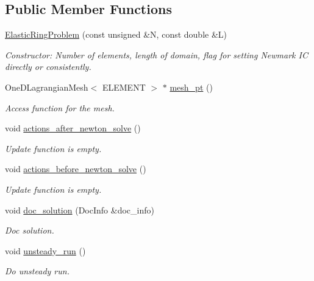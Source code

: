 \subsection*{Public Member Functions}
\begin{DoxyCompactItemize}
\item 
\hyperlink{classElasticRingProblem_a57be33a379c1ec4418a7fb3e8db8ef2b}{Elastic\+Ring\+Problem} (const unsigned \&N, const double \&L)
\begin{DoxyCompactList}\small\item\em Constructor\+: Number of elements, length of domain, flag for setting Newmark IC directly or consistently. \end{DoxyCompactList}\item 
One\+D\+Lagrangian\+Mesh$<$ E\+L\+E\+M\+E\+NT $>$ $\ast$ \hyperlink{classElasticRingProblem_a763200d4985bca4a120f2be2a217f4a8}{mesh\+\_\+pt} ()
\begin{DoxyCompactList}\small\item\em Access function for the mesh. \end{DoxyCompactList}\item 
void \hyperlink{classElasticRingProblem_ab0eb0dcecfa7e9c9e52ecf319f6e873e}{actions\+\_\+after\+\_\+newton\+\_\+solve} ()
\begin{DoxyCompactList}\small\item\em Update function is empty. \end{DoxyCompactList}\item 
void \hyperlink{classElasticRingProblem_aac5f3adac1e1a42492bd428eeb732a3d}{actions\+\_\+before\+\_\+newton\+\_\+solve} ()
\begin{DoxyCompactList}\small\item\em Update function is empty. \end{DoxyCompactList}\item 
void \hyperlink{classElasticRingProblem_a9aa904e4cf82d45711f890cd8440ced9}{doc\+\_\+solution} (Doc\+Info \&doc\+\_\+info)
\begin{DoxyCompactList}\small\item\em Doc solution. \end{DoxyCompactList}\item 
void \hyperlink{classElasticRingProblem_acd30c4363ffedbaadc1523aa8b85523b}{unsteady\+\_\+run} ()
\begin{DoxyCompactList}\small\item\em Do unsteady run. \end{DoxyCompactList}\item 

\end{DoxyCompactItemize}
